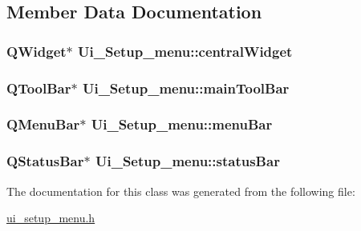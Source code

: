 \subsection{Member Data Documentation}
\hypertarget{classUi__Setup__menu_a8ad7b9373da2ac90d9d7a70bacccb140}{
\subsubsection[{central\-Widget}]{\setlength{\rightskip}{0pt plus 5cm}Q\-Widget$\ast$ Ui\-\_\-\-Setup\-\_\-menu\-::central\-Widget}}\label{classUi__Setup__menu_a8ad7b9373da2ac90d9d7a70bacccb140}
\hypertarget{classUi__Setup__menu_a1b4525597f5e83a2eb1afd93ba044a06}{
\subsubsection[{main\-Tool\-Bar}]{\setlength{\rightskip}{0pt plus 5cm}Q\-Tool\-Bar$\ast$ Ui\-\_\-\-Setup\-\_\-menu\-::main\-Tool\-Bar}}\label{classUi__Setup__menu_a1b4525597f5e83a2eb1afd93ba044a06}
\hypertarget{classUi__Setup__menu_a172549e1b5b0799af6b39eae5a58c6f7}{
\subsubsection[{menu\-Bar}]{\setlength{\rightskip}{0pt plus 5cm}Q\-Menu\-Bar$\ast$ Ui\-\_\-\-Setup\-\_\-menu\-::menu\-Bar}}\label{classUi__Setup__menu_a172549e1b5b0799af6b39eae5a58c6f7}
\hypertarget{classUi__Setup__menu_a4f657b28ad5893177d7f88f0675a0a4e}{
\subsubsection[{status\-Bar}]{\setlength{\rightskip}{0pt plus 5cm}Q\-Status\-Bar$\ast$ Ui\-\_\-\-Setup\-\_\-menu\-::status\-Bar}}\label{classUi__Setup__menu_a4f657b28ad5893177d7f88f0675a0a4e}


The documentation for this class was generated from the following file\-:\begin{DoxyCompactItemize}
\item 
\hyperlink{ui__setup__menu_8h}{ui\-\_\-setup\-\_\-menu.\-h}\end{DoxyCompactItemize}

